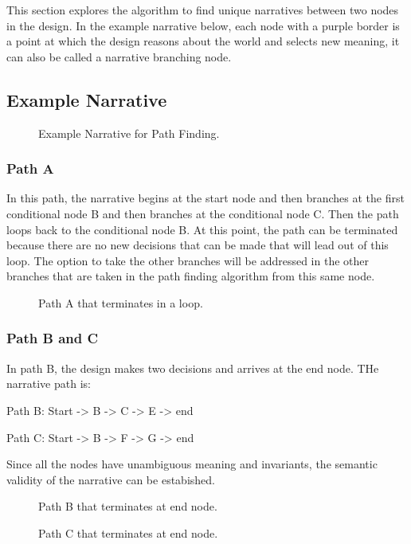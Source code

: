 This section explores the algorithm to find unique narratives between two nodes in the design. In the example narrative below, each node with a purple border is a point at which the design reasons about the world and selects new meaning, it can also be called a narrative branching node.

\subsection{Example Narrative}

\begin{figure}[htbp]
    \centering
    
    \caption{Example Narrative for Path Finding.}
    \label{fig:narrative}
\end{figure}


\subsubsection{Path A}

In this path, the narrative begins at the start node and then branches at the first conditional node B and then branches at the conditional node C. Then the path loops back to the conditional node B. At this point, the path can be terminated because there are no new decisions that can be made that will lead out of this loop. The option to take the other branches will be addressed in the other branches that are taken in the path finding algorithm from this same node.

\begin{figure}[htbp]
    \centering
    
    \caption{Path A that terminates in a loop.}
    \label{fig:narrative_pathA}
\end{figure}


\subsubsection{Path B and C}

In path B, the design makes two decisions and arrives at the end node. THe narrative path is:

Path B:
Start -> B -> C -> E -> end

Path C:
Start -> B -> F -> G -> end

Since all the nodes have unambiguous meaning and invariants, the semantic validity of the narrative can be estabished. 

\begin{figure}[htbp]
    \centering
    
    \caption{Path B that terminates at end node.}
    \label{fig:narrative_pathB}
\end{figure}

\begin{figure}[htbp]
    \centering
    
    \caption{Path C that terminates at end node.}
    \label{fig:narrative_pathC}
\end{figure}